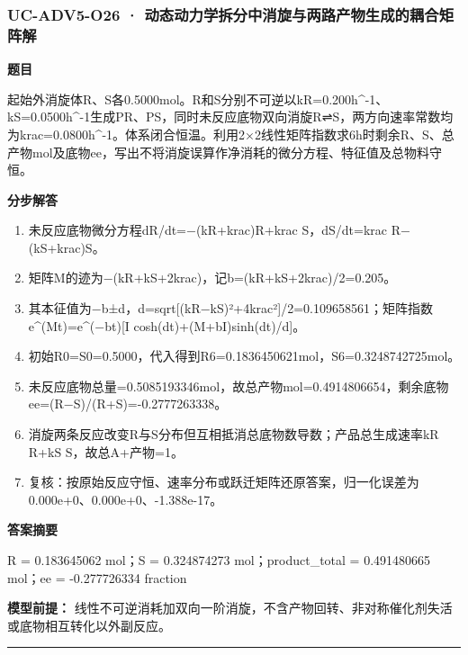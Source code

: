 \documentclass[UTF8,11pt,a4paper]{ctexart}
\begin{document}
\subsubsection*{UC-ADV5-O26 · 动态动力学拆分中消旋与两路产物生成的耦合矩阵解}
\noindent\textbf{题目}\par
起始外消旋体R、S各0.5000mol。R和S分别不可逆以kR=0.200h\textasciicircum{}-1、kS=0.0500h\textasciicircum{}-1生成PR、PS，同时未反应底物双向消旋R⇌S，两方向速率常数均为krac=0.0800h\textasciicircum{}-1。体系闭合恒温。利用2×2线性矩阵指数求6h时剩余R、S、总产物mol及底物ee，写出不将消旋误算作净消耗的微分方程、特征值及总物料守恒。\par
\medskip\noindent\textbf{分步解答}
\begin{enumerate}
\item 未反应底物微分方程dR/dt=−(kR+krac)R+krac S，dS/dt=krac R−(kS+krac)S。
\item 矩阵M的迹为−(kR+kS+2krac)，记b=(kR+kS+2krac)/2=0.205。
\item 其本征值为−b±d，d=sqrt[(kR−kS)²+4krac²]/2=0.109658561；矩阵指数e\textasciicircum{}(Mt)=e\textasciicircum{}(−bt)[I cosh(dt)+(M+bI)sinh(dt)/d]。
\item 初始R0=S0=0.5000，代入得到R6=0.1836450621mol，S6=0.3248742725mol。
\item 未反应底物总量=0.5085193346mol，故总产物mol=0.4914806654，剩余底物ee=(R−S)/(R+S)=-0.2777263338。
\item 消旋两条反应改变R与S分布但互相抵消总底物数导数；产品总生成速率kR R+kS S，故总A+产物=1。
\item 复核：按原始反应守恒、速率分布或跃迁矩阵还原答案，归一化误差为0.000e+0、0.000e+0、-1.388e-17。
\end{enumerate}
\noindent\textbf{答案摘要}\par
R = 0.183645062 mol；S = 0.324874273 mol；product\_total = 0.491480665 mol；ee = -0.277726334 fraction\par
\noindent\textbf{模型前提：}
线性不可逆消耗加双向一阶消旋，不含产物回转、非对称催化剂失活或底物相互转化以外副反应。\par
\medskip\hrule\medskip
{}
\end{document}
